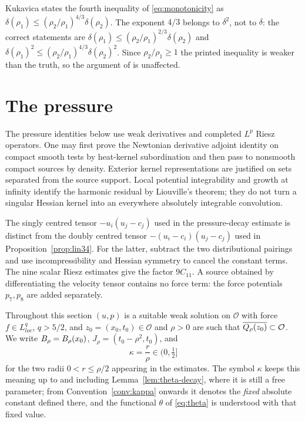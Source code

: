\documentclass[11pt,reqno]{amsart}
\begin{document}
\begin{remark}\label{rem:kukavica-monotonicity}
Kukavica \cite[(2.23) and the line above it]{Kukavica2008} states the fourth
inequality of \eqref{eq:monotonicity} as
$\delta(\rho_{1})\le(\rho_{2}/\rho_{1})^{4/3}\delta(\rho_{2})$. The exponent
$4/3$ belongs to $\delta^{2}$, not to $\delta$: the correct statements are
$\delta(\rho_{1})\le(\rho_{2}/\rho_{1})^{2/3}\delta(\rho_{2})$ and
$\delta(\rho_{1})^{2}\le(\rho_{2}/\rho_{1})^{4/3}\delta(\rho_{2})^{2}$. Since
$\rho_{2}/\rho_{1}\ge1$ the printed inequality is weaker than the truth, so the
argument of \cite{Kukavica2008} is unaffected.
\end{remark}

\section{The pressure}\label{sec:pressure}

\begin{remark}
The pressure identities below use weak derivatives and completed $L^p$
Riesz operators. One may first prove the Newtonian derivative adjoint
identity on compact smooth tests by heat-kernel subordination and then
pass to nonsmooth compact sources by density. Exterior kernel
representations are justified on sets separated from the source support.
Local potential integrability and growth at infinity identify the
harmonic residual by Liouville's theorem; they do not turn a singular
Hessian kernel into an everywhere absolutely integrable convolution.

The singly centred tensor $-u_i(u_j-c_j)$ used in the pressure-decay
estimate is distinct from the doubly centred tensor
$-(u_i-c_i)(u_j-c_j)$ used in Proposition~\ref{prop:lin34}.
For the latter, subtract the two distributional pairings and use
incompressibility and Hessian symmetry to cancel the constant terms.
The nine scalar Riesz estimates give the factor $9C_{11}$.
A source obtained by differentiating the velocity tensor contains no
force term: the force potentials $p_7,p_8$ are added separately.
\end{remark}

Throughout this section $(u,p)$ is a suitable weak solution on $\mathcal{O}$
with force $f\in L^{q}_{loc}$, $q>5/2$, and $z_{0}=(x_{0},t_{0})\in\mathcal{O}$
and $\rho>0$ are such that $\overline{Q_{\rho}(z_{0})}\subset\mathcal{O}$. We write
$B_{\rho}=B_{\rho}(x_{0})$, $J_{\rho}=(t_{0}-\rho^{2},t_{0})$, and
\begin{equation}\label{eq:kappa}
  \kappa=\frac r\rho\in\bigl(0,\tfrac12\bigr]
\end{equation}
for the two radii $0<r\le\rho/2$ appearing in the estimates. The symbol
$\kappa$ keeps this meaning up to and including Lemma~\ref{lem:theta-decay},
where it is still a free parameter; from Convention~\ref{conv:kappa} onwards it
denotes the \emph{fixed} absolute constant defined there, and the functional
$\theta$ of \eqref{eq:theta} is understood with that fixed value.
\end{document}
